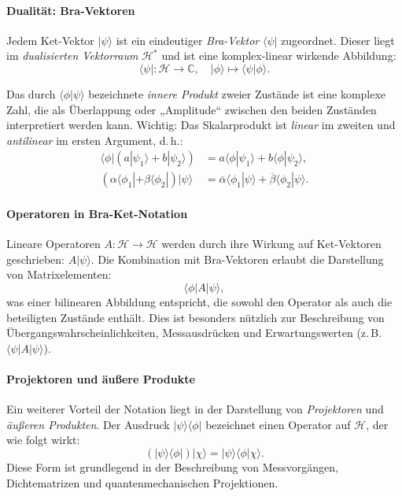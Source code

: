 \paragraph{Dualität: Bra-Vektoren}
Jedem Ket-Vektor $|\psi\rangle$ ist ein eindeutiger \emph{Bra-Vektor} $\langle \psi|$ zugeordnet. Dieser liegt im \emph{dualisierten Vektorraum} $\mathcal{H}^*$ und ist eine komplex-linear wirkende Abbildung:
\[
\langle \psi | : \mathcal{H} \rightarrow \mathbb{C}, \quad |\phi\rangle \mapsto \langle \psi | \phi \rangle.
\]

Das durch $\langle \phi | \psi \rangle$ bezeichnete \emph{innere Produkt} zweier Zustände ist eine komplexe Zahl, die als Überlappung oder „Amplitude“ zwischen den beiden Zuständen interpretiert werden kann. Wichtig: Das Skalarprodukt ist \textit{linear} im zweiten und \textit{antilinear} im ersten Argument, d. h.:
\begin{align*}
\langle \phi | (a |\psi_1\rangle + b |\psi_2\rangle) &= a \langle \phi | \psi_1 \rangle + b \langle \phi | \psi_2 \rangle, \\
(\alpha \langle \phi_1 | + \beta \langle \phi_2 |) |\psi\rangle &= \overline{\alpha} \langle \phi_1 | \psi \rangle + \overline{\beta} \langle \phi_2 | \psi \rangle.
\end{align*}

\paragraph{Operatoren in Bra-Ket-Notation}
Lineare Operatoren $A : \mathcal{H} \rightarrow \mathcal{H}$ werden durch ihre Wirkung auf Ket-Vektoren geschrieben: $A|\psi\rangle$. Die Kombination mit Bra-Vektoren erlaubt die Darstellung von Matrixelementen:
\[
\langle \phi | A | \psi \rangle,
\]
was einer bilinearen Abbildung entspricht, die sowohl den Operator als auch die beteiligten Zustände enthält. Dies ist besonders nützlich zur Beschreibung von Übergangswahrscheinlichkeiten, Messausdrücken und Erwartungswerten (z. B. $\langle \psi | A | \psi \rangle$).

\paragraph{Projektoren und äußere Produkte}
Ein weiterer Vorteil der Notation liegt in der Darstellung von \emph{Projektoren} und \emph{äußeren Produkten}. Der Ausdruck $|\psi\rangle\langle\phi|$ bezeichnet einen Operator auf $\mathcal{H}$, der wie folgt wirkt:
\[
(|\psi\rangle\langle\phi|) |\chi\rangle = |\psi\rangle \langle\phi|\chi\rangle.
\]
Diese Form ist grundlegend in der Beschreibung von Messvorgängen, Dichtematrizen und quantenmechanischen Projektionen.

